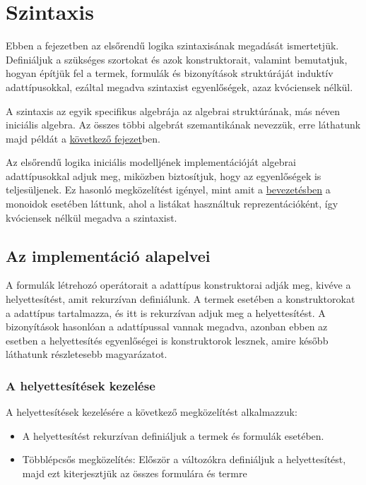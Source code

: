 \chapter{Szintaxis}
\label{ch:syntax}

Ebben a fejezetben az elsőrendű logika szintaxisának megadását ismertetjük. Definiáljuk a szükséges szortokat és azok konstruktorait, valamint bemutatjuk, hogyan építjük fel a termek, formulák és bizonyítások struktúráját induktív adattípusokkal, ezáltal megadva szintaxist egyenlőségek, azaz kvóciensek nélkül.

A szintaxis az egyik specifikus algebrája az algebrai struktúrának, más néven iniciális algebra. Az összes többi algebrát szemantikának nevezzük, erre láthatunk majd példát a \hyperref[ch:models]{következő fejezet}ben.

Az elsőrendű logika iniciális modelljének implementációját algebrai adattípusokkal adjuk meg, miközben biztosítjuk, hogy az egyenlőségek is teljesüljenek. Ez hasonló megközelítést igényel, mint amit a \hyperref[ch:intro]{bevezetésben} a monoidok esetében láttunk, ahol a listákat használtuk reprezentációként, így kvóciensek nélkül megadva a szintaxist.

\section{Az implementáció alapelvei}

A formulák létrehozó operátorait a  adattípus konstruktorai adják meg, kivéve a helyettesítést, amit rekurzívan definiálunk. A termek esetében a konstruktorokat a  adattípus tartalmazza, és itt is rekurzívan adjuk meg a helyettesítést. A bizonyítások hasonlóan a  adattípussal vannak megadva, azonban ebben az esetben a helyettesítés egyenlőségei is konstruktorok lesznek, amire később láthatunk részletesebb magyarázatot.

\subsection{A helyettesítések kezelése}

A helyettesítések kezelésére a következő megközelítést alkalmazzuk:

\begin{itemize}
\item A helyettesítést rekurzívan definiáljuk a termek és formulák esetében.
\item Többlépcsős megközelítés: Először a változókra definiáljuk a helyettesítést, majd ezt kiterjesztjük az összes formulára és termre
\end{itemize}

